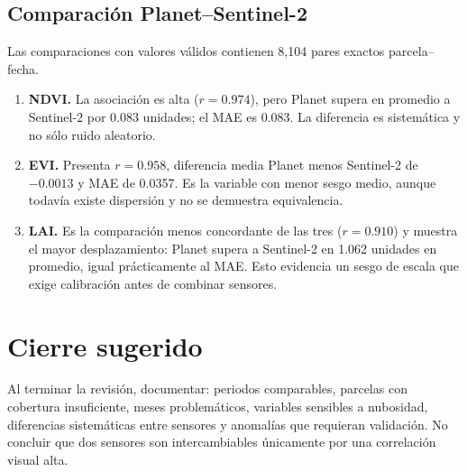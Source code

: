 ﻿\documentclass[11pt,a4paper]{article}
\begin{document}
\subsection{Comparación Planet--Sentinel-2}
Las comparaciones con valores válidos contienen 8,104 pares exactos parcela--fecha.
\begin{enumerate}[resume]
  \item \textbf{NDVI.} La asociación es alta ($r=0.974$), pero Planet supera en
  promedio a Sentinel-2 por 0.083 unidades; el MAE es 0.083. La diferencia es
  sistemática y no sólo ruido aleatorio.

  \item \textbf{EVI.} Presenta $r=0.958$, diferencia media Planet menos
  Sentinel-2 de $-0.0013$ y MAE de 0.0357. Es la variable con menor sesgo medio,
  aunque todavía existe dispersión y no se demuestra equivalencia.

  \item \textbf{LAI.} Es la comparación menos concordante de las tres
  ($r=0.910$) y muestra el mayor desplazamiento: Planet supera a Sentinel-2 en
  1.062 unidades en promedio, igual prácticamente al MAE. Esto evidencia un
  sesgo de escala que exige calibración antes de combinar sensores.
\end{enumerate}

\section{Cierre sugerido}
Al terminar la revisión, documentar: periodos comparables, parcelas con cobertura
insuficiente, meses problemáticos, variables sensibles a nubosidad, diferencias
sistemáticas entre sensores y anomalías que requieran validación. No concluir que
dos sensores son intercambiables únicamente por una correlación visual alta.
\end{document}
